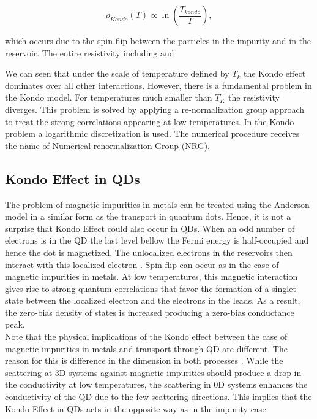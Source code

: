 \begin{equation}
\rho_{Kondo}(T) \propto \ln{\left( \frac{T_{kondo}}{T} \right)},
\label{logKondo}
\end{equation}



which occurs due to the spin-flip between the particles in the impurity and in the reservoir. The entire resistivity including  and 

We can seen that under the scale of temperature defined by $T_k$ the Kondo effect dominates over all other interactions. However, there is a fundamental problem in the Kondo model. For temperatures much smaller than $T_K$ the resistivity diverges. This problem is solved by applying a re-normalization group approach to treat the strong correlations appearing at low temperatures. In the Kondo problem a logarithmic discretization is used. The numerical procedure receives the name of Numerical renormalization Group (NRG). 


\subsection{Kondo Effect in QDs}


The problem of magnetic impurities in metals can be treated using the Anderson model in a similar form as the transport
 in quantum dots. Hence, it is not a surprise that Kondo Effect could also occur in QDs. When an odd number of electrons is in the QD the last level bellow the Fermi energy is half-occupied and hence the dot is magnetized. The unlocalized electrons in the reservoirs then interact with this localized electron . Spin-flip can occur as in the case of  magnetic impurities in metals. At low temperatures, this magnetic  interaction gives rise to strong quantum correlations that favor the formation of a singlet state between the localized electron and the electrons in the leads. As a result, the zero-bias density of states is increased producing a zero-bias conductance peak. \\

Note that the physical implications of the Kondo effect  between the case of magnetic impurities in metals and transport through QD are different. The reason for this is difference in the dimension in both processes . While the scattering at 3D systems against magnetic impurities should produce a drop in the conductivity at low temperatures, the scattering in 0D systems enhances the conductivity of the QD due to the few scattering directions. This implies that the Kondo Effect in QDs acts in the opposite way as in the impurity case. 
















